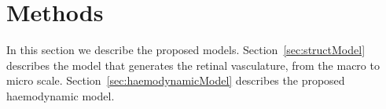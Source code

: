 \documentclass[11pt,]{article}
\begin{document}
\section{Methods}\label{sec:methods}

In this section we describe the proposed models.
Section~\ref{sec:structModel} describes the model that generates the
retinal vasculature, from the macro to micro scale.
Section~\ref{sec:haemodynamicModel} describes the proposed haemodynamic
model.

\begin{figure}[ht!] \centering
    \centering
  \begin{subfigure}[t]{.02\textwidth}
  \end{subfigure}
  \begin{subfigure}[t]{.6\textwidth}
  \end{subfigure}
  \\
  \begin{subfigure}[t]{.02\textwidth}
  \end{subfigure}
  \begin{subfigure}[t]{.58\textwidth}
  \end{subfigure}


\end{figure}
\end{document}
